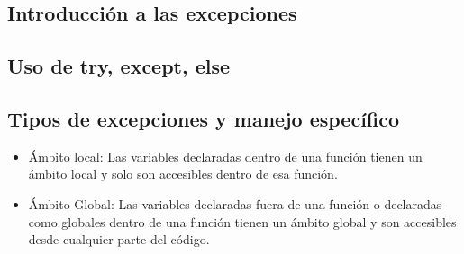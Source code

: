 \subsection{Introducción a las excepciones}
\subsection{Uso de try, except, else}
\subsection{Tipos de excepciones y manejo específico}
\begin{itemize}
    \item Ámbito local: Las variables declaradas dentro de una función tienen un ámbito local y solo son accesibles dentro de esa función.\\
\end{itemize}

    \begin{figure}[h]
        \centering
      \end{figure}


\begin{itemize}
    \item Ámbito Global: Las variables declaradas fuera de una función o declaradas como globales dentro de una función tienen un ámbito global y son accesibles desde cualquier parte del código.
\end{itemize}
    \begin{figure}[h]
        \centering
      \end{figure}
